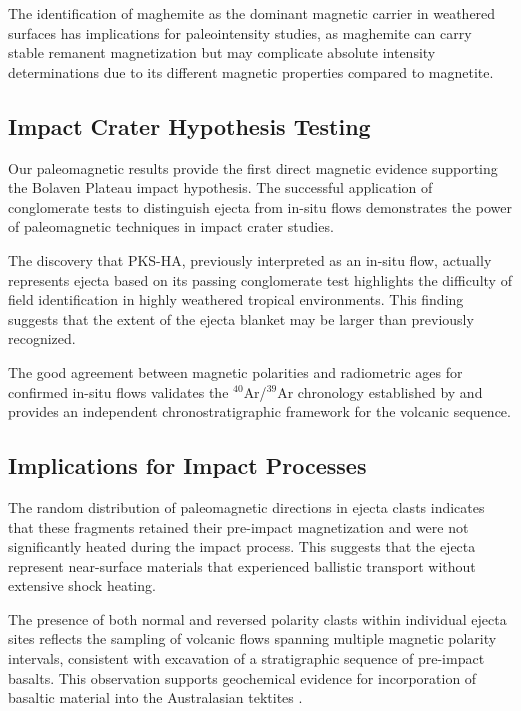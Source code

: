 \documentclass[twocolumn,11pt]{article}
\begin{document}
The identification of maghemite as the dominant magnetic carrier in weathered surfaces has implications for paleointensity studies, as maghemite can carry stable remanent magnetization but may complicate absolute intensity determinations due to its different magnetic properties compared to magnetite.

\subsection{Impact Crater Hypothesis Testing}

Our paleomagnetic results provide the first direct magnetic evidence supporting the Bolaven Plateau impact hypothesis. The successful application of conglomerate tests to distinguish ejecta from in-situ flows demonstrates the power of paleomagnetic techniques in impact crater studies.

The discovery that PKS-HA, previously interpreted as an in-situ flow, actually represents ejecta based on its passing conglomerate test highlights the difficulty of field identification in highly weathered tropical environments. This finding suggests that the extent of the ejecta blanket may be larger than previously recognized.

The good agreement between magnetic polarities and radiometric ages for confirmed in-situ flows validates the $^{40}$Ar/$^{39}$Ar chronology established by \citet{Sieh2019} and provides an independent chronostratigraphic framework for the volcanic sequence.

\subsection{Implications for Impact Processes}

The random distribution of paleomagnetic directions in ejecta clasts indicates that these fragments retained their pre-impact magnetization and were not significantly heated during the impact process. This suggests that the ejecta represent near-surface materials that experienced ballistic transport without extensive shock heating.

The presence of both normal and reversed polarity clasts within individual ejecta sites reflects the sampling of volcanic flows spanning multiple magnetic polarity intervals, consistent with excavation of a stratigraphic sequence of pre-impact basalts. This observation supports geochemical evidence for incorporation of basaltic material into the Australasian tektites \citep{Sieh2019}.
\end{document}
